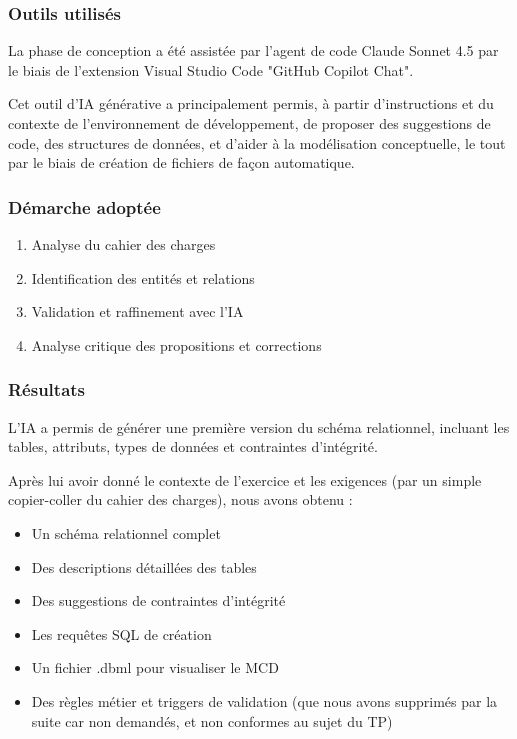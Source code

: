 \documentclass[12pt,a4paper]{article}
\begin{document}
\subsubsection{Outils utilisés}
La phase de conception a été assistée par l'agent de code Claude Sonnet 4.5 par le biais de l'extension Visual Studio Code "GitHub Copilot Chat".

Cet outil d'IA générative a principalement permis, à partir d'instructions et du contexte de l'environnement de développement, de proposer des suggestions de code, des structures de données, et d'aider à la modélisation conceptuelle, le tout par le biais de création de fichiers de façon automatique.

\subsubsection{Démarche adoptée}
\begin{enumerate}
    \item Analyse du cahier des charges
    \item Identification des entités et relations
    \item Validation et raffinement avec l'IA
    \item Analyse critique des propositions et corrections
\end{enumerate}

\subsubsection{Résultats}
L'IA a permis de générer une première version du schéma relationnel, incluant les tables, attributs, types de données et contraintes d'intégrité.

Après lui avoir donné le contexte de l'exercice et les exigences (par un simple copier-coller du cahier des charges), nous avons obtenu :
\begin{itemize}
    \item Un schéma relationnel complet
    \item Des descriptions détaillées des tables
    \item Des suggestions de contraintes d'intégrité
    \item Les requêtes SQL de création
    \item Un fichier .dbml pour visualiser le MCD
    \item Des règles métier et triggers de validation (que nous avons supprimés par la suite car non demandés, et non conformes au sujet du TP)
\end{itemize}
\end{document}
